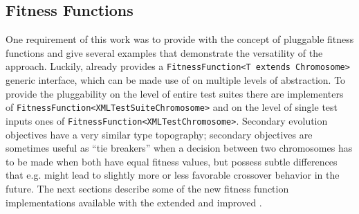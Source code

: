 \subsection{Fitness Functions}
One requirement of this work was to provide \xmlmate with the concept of pluggable fitness functions and 
give several examples that demonstrate the versatility of the approach. Luckily, \evosuite already provides 
a \texttt{FitnessFunction<T extends Chromosome>} generic interface, which can be made use of on multiple 
levels of abstraction. To provide the pluggability on the level of  entire test suites there are implementers of
\texttt{FitnessFunction<XMLTestSuiteChromosome>} and on the level of single test inputs ones of 
\texttt{FitnessFunction<XMLTestChromosome>}. 
Secondary evolution objectives have a very similar type topography; secondary objectives are sometimes useful 
as ``tie breakers'' when a decision between two chromosomes has to be made when both have equal fitness values,
but possess subtle differences that e.g. might lead to slightly more or less favorable crossover behavior in 
the future. The next sections describe some of the new fitness function implementations available with the 
extended and improved \xmlmate.
